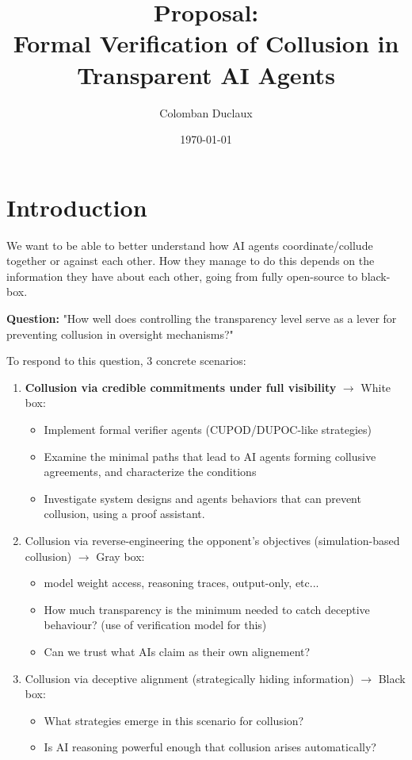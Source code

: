 \documentclass{article}
\title{\textbf{Proposal:} \\ Formal Verification of Collusion in Transparent AI Agents}
\author{Colomban Duclaux}
\date{\today}
\begin{document}
\maketitle

\section{Introduction}
We want to be able to better understand how AI agents coordinate/collude together or against each other. How they manage to do this depends on the information they have about each other, going from fully open-source to black-box.

\textbf{Question:} "How well does controlling 
the transparency level serve as a lever for preventing collusion in oversight mechanisms?"

To respond to this question, 3 concrete scenarios: \begin{enumerate}
    \item \textbf{ Collusion via credible commitments under full visibility} $\to$ White box: \begin{itemize}
        \item Implement formal verifier agents (CUPOD/DUPOC-like strategies)
        \item Examine the minimal paths that lead to AI agents forming collusive agreements, and characterize the conditions
        \item Investigate system designs and agents behaviors that can prevent collusion, using a proof assistant.
    \end{itemize}
    \item Collusion via reverse-engineering the opponent's objectives (simulation-based collusion) $\to$ Gray box: \begin{itemize}
        \item model weight access, reasoning traces, output-only, etc...
        \item How much transparency is the minimum needed to catch deceptive behaviour? (use of verification model for this)
        \item Can we trust what AIs claim as their own alignement?
    \end{itemize}
    \item Collusion via deceptive alignment (strategically hiding information) $\to$ Black box: \begin{itemize}
        \item What strategies emerge in this scenario for collusion?
        \item Is AI reasoning powerful enough that collusion arises automatically?
    \end{itemize}
\end{enumerate}
\end{document}
